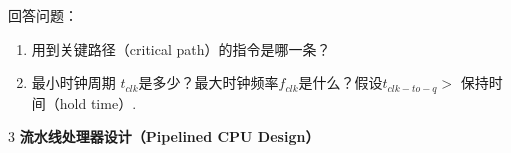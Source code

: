 \documentclass[12pt,a4paper]{article}
\newenvironment{problems}{\begin{list}{}{\renewcommand{\makelabel}[1]{\textbf{##1}.\hfil}}}{\end{list}}
\begin{document}
\begin{problems}
 

    回答问题：
    \begin{enumerate}
        \item 用到关键路径（critical path）的指令是哪一条？
        \item 最小时钟周期 $t_{clk}$是多少？最大时钟频率$f_{clk}$是什么？假设$t_{clk-to-q}>$ 保持时间（hold time）. 
    \end{enumerate}

    \item[3] \textbf{流水线处理器设计（Pipelined CPU Design）} 




\end{problems}
\end{document}

